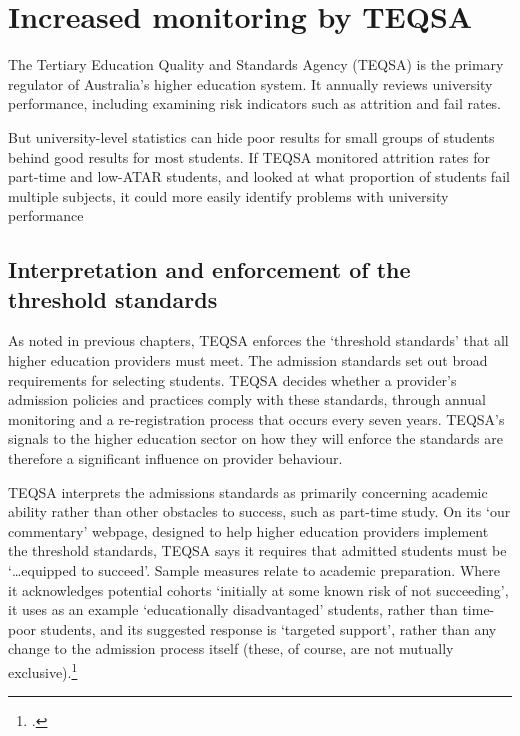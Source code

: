 \chapter{Increased monitoring by TEQSA}\label{chap:7}

The Tertiary Education Quality and Standards Agency (TEQSA) is the primary regulator of Australia's higher education system. It annually reviews university performance, including examining risk indicators such as attrition and fail rates.

But university-level statistics can hide poor results for small groups of students behind good results for most students. If TEQSA monitored attrition rates for part-time and low-ATAR students, and looked at what proportion of students fail multiple subjects, it could more easily identify problems with university performance

\section{Interpretation and enforcement of the threshold standards}\label{sec:7.1}

As noted in previous chapters, TEQSA enforces the `threshold standards' that all higher education providers must meet. The admission standards set out broad requirements for selecting students. TEQSA decides whether a provider's admission policies and practices comply with these standards, through annual monitoring and a re-registration process that occurs every seven years. TEQSA's signals to the higher education sector on how they will enforce the standards are therefore a significant influence on provider behaviour.

TEQSA interprets the admissions standards as primarily concerning academic ability rather than other obstacles to success, such as part-time study. On its `our commentary' webpage, designed to help higher education providers implement the threshold standards, TEQSA says it requires that admitted students must be `\ldots{}equipped to succeed'. Sample measures relate to academic preparation. Where it acknowledges potential cohorts `initially at some known risk of not succeeding', it uses as an example `educationally disadvantaged' students, rather than time-poor students, and its suggested response is `targeted support', rather than any change to the admission process itself (these, of course, are not mutually exclusive).\footcite{TEQSA2017}

